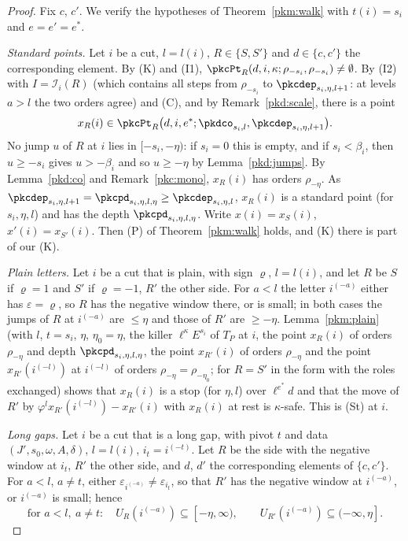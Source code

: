 \documentclass[10pt]{amsart}
\theoremstyle{definition}
\theoremstyle{remark}
\begin{document}
\begin{proof}
Fix $c$, $c'$. We verify the hypotheses of Theorem~\ref{pkm:walk} with $t(i)=s_i$ and
$e=e'=e^*$.

\emph{Standard points.} Let $i$ be a cut, $l=l(i)$, $R\in\{S,S'\}$ and $d\in\{c,c'\}$ the
corresponding element. By (K) and (I1), $\pkcPt_R(d,i,\kappa;\rho_{-s_i},\rho_{-s_i})\ne\emptyset$. By
(I2) with $I=\mathcal I_i(R)$ (which contains all steps from $\rho_{-s_i}$ to
$\pkcdep_{s_i,\eta,l+1}$: at levels $a>l$ the two orders agree) and (C), and by
Remark~\ref{pkd:scale}, there is a point
\[
x_R(i)\in\pkcPt_R\bigl(d,i,e^*;\pkdco_{s_i,l},\pkcdep_{s_i,\eta,l+1}\bigr).
\]
No jump $u$ of $R$ at $i$ lies in $[-s_i,-\eta)$: if $s_i=0$ this is empty, and if $s_i<\beta_i$,
then $u\ge-s_i$ gives $u>-\beta_i$ and so $u\ge-\eta$ by Lemma~\ref{pkd:jumps}. By
Lemma~\ref{pkd:co} and Remark~\ref{pkc:mono}, $x_R(i)$ has orders $\rho_{-\eta}$. As
$\pkcdep_{s_i,\eta,l+1}=\pkcpd_{s_i,\eta,l,\eta}\ge\pkcdep_{s_i,\eta,l}$, $x_R(i)$ is a standard point
(for $s_i,\eta,l$) and has the depth $\pkcpd_{s_i,\eta,l,\eta}$. Write $x(i)=x_S(i)$, $x'(i)=x_{S'}(i)$.
Then (P) of Theorem~\ref{pkm:walk} holds, and (K) there is part of our (K).

\emph{Plain letters.} Let $i$ be a cut that is plain, with sign $\varrho$, $l=l(i)$, and let $R$ be $S$ if $\varrho=1$
and $S'$ if $\varrho=-1$, $R'$ the other side. For $a<l$ the letter $i^{(-a)}$ either has
$\varepsilon=\varrho$, so $R$ has the negative window there, or is small; in both cases the jumps of $R$
at $i^{(-a)}$ are $\le\eta$ and those of $R'$ are $\ge-\eta$. Lemma~\ref{pkm:plain} (with $l$,
$t=s_i$, $\eta$, $\eta_0=\eta$, the killer $\ell^\kappa E^{s_i}$ of $T_P$ at $i$, the point $x_R(i)$ of
orders $\rho_{-\eta}$ and depth $\pkcpd_{s_i,\eta,l,\eta}$, the point $x_{R'}(i)$ of orders $\rho_{-\eta}$
and the point $x_{R'}(i^{(-l)})$ at $i^{(-l)}$ of orders $\rho_{-\eta}=\rho_{-\eta_0}$; for $R=S'$ in
the form with the roles exchanged) shows that $x_R(i)$ is a stop (for $\eta,l$) over $\ell^{e^*}d$ and
that the move of $R'$ by $\varphi^lx_{R'}(i^{(-l)})-x_{R'}(i)$ with $x_R(i)$ at rest is $\kappa$-safe.
This is (St) at $i$.

\emph{Long gaps.} Let $i$ be a cut that is a long gap, with pivot $t$ and data $(J',s_0,\omega,A,\delta)$, $l=l(i)$,
$i_t=i^{(-t)}$. Let $R$ be the side with the negative window at $i_t$, $R'$ the other side, and $d$, $d'$
the corresponding elements of $\{c,c'\}$. For $a<l$, $a\ne t$, either $\varepsilon_{i^{(-a)}}\ne
\varepsilon_{i_t}$, so that $R'$ has the negative window at $i^{(-a)}$, or $i^{(-a)}$ is small; hence
\begin{equation}\label{pkd:eq-updown}
\text{for }a<l,\ a\ne t:\quad U_R(i^{(-a)})\subseteq[-\eta,\infty),\qquad
U_{R'}(i^{(-a)})\subseteq(-\infty,\eta].
\end{equation}


\end{proof}
\end{document}
